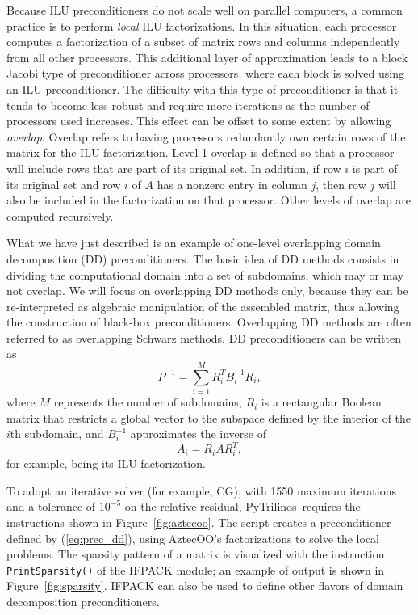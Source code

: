 \documentclass[acmtocl]{acmtrans2m}
\newcommand{\PyTrilinos}{{PyTrilinos}}
\begin{document}
Because ILU preconditioners do not scale well on parallel computers, a
common practice is to perform {\em local} ILU factorizations.  In this
situation, each processor computes a factorization of a subset of
matrix rows and columns independently from all other processors.  This
additional layer of approximation leads to a block Jacobi type of
preconditioner across processors, where each block is solved using an
ILU preconditioner.  The difficulty with this type of preconditioner
is that it tends to become less robust and require more iterations as
the number of processors used increases.  This effect can be offset to
some extent by allowing {\em overlap}.  Overlap refers to having
processors redundantly own certain rows of the matrix for the ILU
factorization.  Level-1 overlap is defined so that a processor will
include rows that are part of its original set.  In addition, if row
$i$ is part of its original set and row $i$ of $A$ has a nonzero entry
in column $j$, then row $j$ will also be included in the factorization
on that processor.  Other levels of overlap are computed recursively.

What we have just described is an example of one-level overlapping
domain decomposition (DD) preconditioners.  The basic idea of DD
methods consists in dividing the computational domain into a set of
subdomains, which may or may not overlap. We will focus on overlapping
DD methods only, because they can be re-interpreted as algebraic
manipulation of the assembled matrix, thus allowing the construction
of black-box preconditioners. Overlapping DD methods are often
referred to as overlapping Schwarz methods. DD preconditioners can be
written as
\begin{equation}
  \label{eq:prec_dd}
  P^{-1} = \sum_{i=1}^M R_i^T B_i^{-1} R_i,
\end{equation}
where $M$ represents the number of subdomains, $R_i$ is a rectangular
Boolean matrix that restricts a global vector to the subspace defined
by the interior of the $i$th subdomain, and $B_i^{-1}$ approximates
the inverse of
\begin{equation}
  \label{eq:aztecoo_tilde_a}
  A_i = R_i A R_i^T,
\end{equation}
for example, being its ILU factorization.

\medskip

To adopt an iterative solver (for example, CG), with 1550 maximum
iterations and a tolerance of $10^{-5}$ on the relative residual,
\PyTrilinos\ requires the instructions shown in
Figure~\ref{fig:aztecoo}. The script creates a preconditioner defined by
(\ref{eq:prec_dd}), using AztecOO's factorizations to solve the local
problems. The sparsity pattern of a matrix is visualized with the
instruction \verb!PrintSparsity()! of the IFPACK module; an example of
output is shown in Figure~\ref{fig:sparsity}. IFPACK can also be used
to define other flavors of domain decomposition preconditioners.
\end{document}
